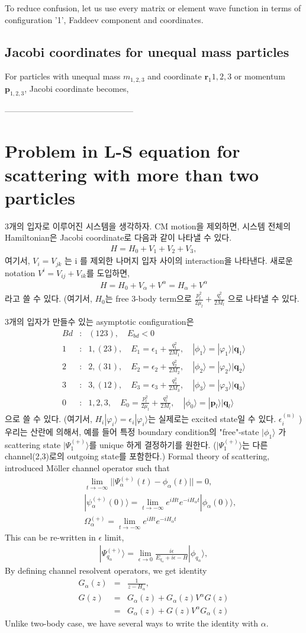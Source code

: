 \documentclass[11pt]{article}
\def\bm{\boldsymbol}
\newcommand{\bea}{\begin{eqnarray}}
\newcommand{\eea}{\end{eqnarray}}
\newcommand{\no}{\nonumber \\}
\newcommand{\vp}{{\bm p}}
\newcommand{\vq}{{\bm q}}
\newcommand{\vr}{{\bm r}}
\newcommand{\ra}{\rangle}
\begin{document}
To reduce confusion, let us use every matrix or element wave 
function in terms of configuration '1', Faddeev component 
and coordinates.

\subsection{Jacobi coordinates for unequal mass particles}
For particles with unequal mass $m_{1,2,3}$ and coordinate $\vr_1{1,2,3}$
or momentum $\vp_{1,2,3}$, Jacobi coordinate becomes,


-----------------------------------------------

\section{Problem in L-S equation for scattering with more than two particles} 
3개의 입자로 이루어진 시스템을 생각하자. CM motion을 제외하면, 
시스템 전체의 Hamiltonian은 Jacobi coordinate로 다음과 같이 나타낼 수 있다. 
\bea 
H=H_0+V_1+V_2+V_3, 
\eea 
여기서, $V_i=V_{jk}$ 는 i 를 제외한 나머지 입자 사이의 interaction을 나타낸다. 
새로운 notation $V^i=V_{ij}+V_{ik}$를 도입하면, 
\bea 
H=H_0+V_\alpha+V^\alpha=H_\alpha+V^\alpha 
\eea  
라고 쓸 수 있다. (여기서, $H_0$는 free 3-body term으로 $\frac{p_l^2}{2\mu_l}+\frac{q_l^2}{2M_l}$
으로 나타낼 수 있다. 

3개의 입자가 만들수 있는 asymptotic configuration은 
\bea 
Bd&:&(123),\quad  E_{bd}<0\no  
1 &:&1,(23),\quad E_1=\epsilon_1+\frac{q_1^2}{2M_1},\quad |\phi_1\ra =|\varphi_1\ra|\vq_1\ra \no 
2 &:&2,(31),\quad E_2=\epsilon_2+\frac{q_2^2}{2M_2},\quad |\phi_2\ra =|\varphi_2\ra|\vq_2\ra\no 
3 &:&3,(12),\quad E_3=\epsilon_3+\frac{q_3^2}{2M_3},\quad |\phi_3\ra =|\varphi_3\ra|\vq_3\ra\no 
0 &:& 1,2,3,\quad E_0=\frac{p_l^2}{2\mu_l}+\frac{q_l^2}{2M_l},
  \quad |\phi_0\ra=|\vp_l\ra |\vq_l\ra  
\eea 
으로 쓸 수 있다. (여기서, $H_i|\varphi_i\ra=\epsilon_i|\varphi_i\ra$는 실제로는 excited state일 수 있다. $\epsilon_i^{(n)}$ )
우리는 산란에 의해서, 예를 들어 특정 boundary condition의 "free"-state $|\phi_1\ra$ 가 
scattering state $|\Psi_1^{(+)}\ra$를 unique 하게 결정하기를 원한다. 
($|\Psi_1^{(+)}\ra$는 다른 channel(2,3)로의 outgoing state를 포함한다.)
Formal theory of scattering, introduced M\"{o}ller channel operator such that
\bea 
& &\lim_{t\to -\infty}||\Psi^{(+)}_\alpha(t)-\phi_\alpha(t)||=0, \no 
& &|\psi^{(+)}_\alpha(0)\ra=\lim_{t\to -\infty} e^{iHt}e^{-iH_\alpha t}|\phi_{\alpha}(0)\ra,\no 
& &\Omega_\alpha^{(+)}=\lim_{t\to -\infty} e^{iHt}e^{-iH_\alpha t}
\eea 
This can be re-written in $\epsilon$ limit,
\bea 
|\Psi_{q_\alpha}^{(+)}\ra=\lim_{\epsilon\to 0}\frac{i\epsilon}{E_{q_\alpha}+i\epsilon-H}|\phi_{q_\alpha}\ra, 
\eea 
By defining channel resolvent operators, we get identity
\bea 
G_\alpha(z)&=&\frac{1}{z-H_\alpha},\no 
G(z)&=&G_\alpha(z)+G_\alpha(z)V^\alpha G(z) \no 
    &=&G_\alpha(z)+G(z)V^\alpha G_\alpha(z)
\eea 
Unlike two-body case, we have several ways to write the identity with $\alpha$.
\end{document}
